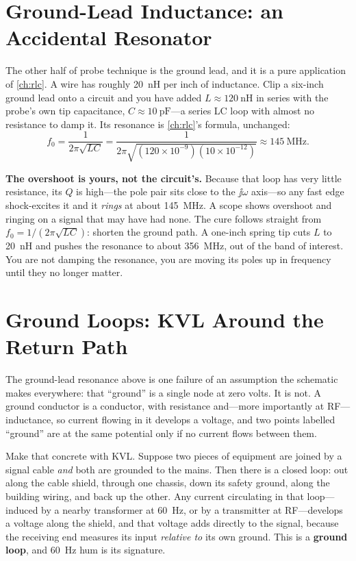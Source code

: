 \section{Ground-Lead Inductance: an Accidental Resonator}
The other half of probe technique is the ground lead, and it is a pure application of
\cref{ch:rlc}. A wire has roughly \SI{20}{\nano\henry} per inch of inductance. Clip a
six-inch ground lead onto a circuit and you have added \(L\approx\SI{120}{\nano\henry}\)
in series with the probe's own tip capacitance, \(C\approx\SI{10}{\pico\farad}\)---a
series LC loop with almost no resistance to damp it. Its resonance is
\cref{ch:rlc}'s formula, unchanged:
\[
f_0=\frac{1}{2\pi\sqrt{LC}}
=\frac{1}{2\pi\sqrt{(120\times10^{-9})(10\times10^{-12})}}
\approx\SI{145}{\mega\hertz}.
\]

\begin{physicalbox}
\textbf{The overshoot is yours, not the circuit's.} Because that loop has very little
resistance, its \(Q\) is high---the pole pair sits close to the \(\jj\omega\) axis---so
any fast edge shock-excites it and it \emph{rings} at about \SI{145}{\mega\hertz}. A
scope shows overshoot and ringing on a signal that may have had none. The cure follows
straight from \(f_0=1/(2\pi\sqrt{LC})\): shorten the ground path. A one-inch spring
tip cuts \(L\) to \SI{20}{\nano\henry} and pushes the resonance to about
\SI{356}{\mega\hertz}, out of the band of interest. You are not damping the resonance,
you are moving its poles up in frequency until they no longer matter.
\end{physicalbox}

\section{Ground Loops: KVL Around the Return Path}
\label{sec:groundloops}
The ground-lead resonance above is one failure of an assumption the schematic makes
everywhere: that ``ground'' is a single node at zero volts. It is not. A ground
conductor is a conductor, with resistance and---more importantly at RF---inductance,
so current flowing in it develops a voltage, and two points labelled ``ground'' are
at the same potential only if no current flows between them.

Make that concrete with KVL. Suppose two pieces of equipment are joined by a signal
cable \emph{and} both are grounded to the mains. Then there is a closed loop:
out along the cable shield, through one chassis, down its safety ground, along the
building wiring, and back up the other. Any current circulating in that loop---
induced by a nearby transformer at \SI{60}{\hertz}, or by a transmitter at
RF---develops a voltage along the shield, and that voltage adds directly to the
signal, because the receiving end measures its input \emph{relative to} its own
ground. This is a \textbf{ground loop}, and \SI{60}{\hertz} hum is its signature.

